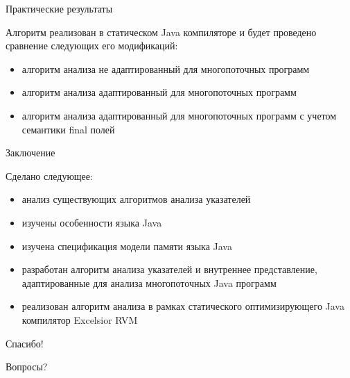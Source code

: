 \documentclass[usenames,dvipsnames,pdftex,unicode]{beamer}
\begin{document}
\begin{frame}{Практические результаты}

  Алгоритм реализован в статическом Java компиляторе и будет проведено
  сравнение следующих его модификаций:
  \begin{itemize}
      \item алгоритм анализа не адаптированный для многопоточных программ
      \item алгоритм анализа адаптированный для многопоточных программ
      \item алгоритм анализа адаптированный для многопоточных программ с
            учетом семантики final полей
  \end{itemize}
\end{frame}

\begin{frame}{Заключение}

  Сделано следующее:
  \begin{itemize}
    \item анализ существующих алгоритмов анализа указателей
    \item изучены особенности языка Java
    \item изучена спецификация модели памяти языка Java
    \item разработан алгоритм анализа указателей и внутреннее представление,
          адаптированные для анализа многопоточных Java программ
    \item реализован алгоритм анализа в рамках статического оптимизирующего
          Java компилятор Excelsior RVM
  \end{itemize}

\end{frame}

\begin{frame}

  \centering\huge

  Спасибо!

  Вопросы?

\end{frame}
\end{document}
